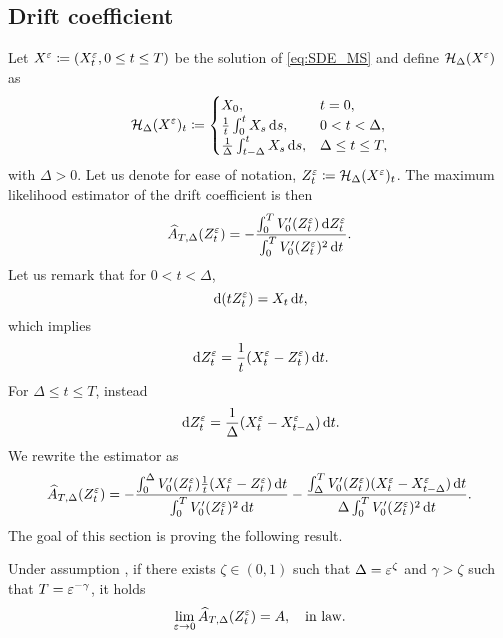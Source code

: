 \documentclass[10pt]{article}
\begin{document}
\subsection{Drift coefficient}\label{sec:ACont}
Let $X^\varepsilon \coloneqq (X^\varepsilon_t, 0\leq t \leq T)$ be the solution of \eqref{eq:SDE_MS} and define $\mathcal H_\Delta(X^\varepsilon)$ as
\begin{equation}\label{eq:ContMovingAverage}
	\mathcal H_\Delta(X^\varepsilon)_t \coloneqq 
	\begin{cases} 
	X_0, &t = 0, \\
	\frac1t \int_0^t X_s \,\mathrm{d} s, &0 < t < \Delta, \\
	\frac1\Delta \int_{t-\Delta}^t X_s \,\mathrm{d} s, &\Delta \leq t \leq T,\\
	\end{cases}
\end{equation}
with $\Delta > 0$. Let us denote for ease of notation, $Z^\varepsilon_t \coloneqq \mathcal H_\Delta(X^\varepsilon)_t$. The maximum likelihood estimator of the drift coefficient is then
\begin{equation}
	\widehat A_{T, \Delta}(Z_t^\varepsilon) = - \frac{\int_0^T V_0'(Z^\varepsilon_t) \,\mathrm{d} Z^\varepsilon_t}{\int_0^T V_0'(Z^\varepsilon_t)^2 \,\mathrm{d} t}.
\end{equation}
Let us remark that for $0 < t < \Delta$, 
\begin{equation}
	\,\mathrm{d} (t Z^\varepsilon_t) = X_t \,\mathrm{d} t,
\end{equation}
which implies 
\begin{equation}\label{eq:MovAvDifferential}
	\,\mathrm{d} Z^\varepsilon_t = \frac1t (X^\varepsilon_t - Z^\varepsilon_t) \,\mathrm{d} t.
\end{equation}
For $\Delta \leq t \leq T$, instead
\begin{equation}
	\,\mathrm{d} Z^\varepsilon_t = \frac1\Delta (X^\varepsilon_t - X^\varepsilon_{t-\Delta}) \,\mathrm{d} t.
\end{equation}
We rewrite the estimator as
\begin{equation}
	\widehat A_{T, \Delta}(Z_t^\varepsilon) = -\frac{\int_0^\Delta V_0'(Z^\varepsilon_t) \frac1t (X^\varepsilon_t - Z^\varepsilon_t) \,\mathrm{d} t}{\int_0^T V_0'(Z^\varepsilon_t)^2 \,\mathrm{d} t} -\frac{\int_\Delta^T V_0'(Z^\varepsilon_t) (X^\varepsilon_t - X^\varepsilon_{t-\Delta}) \,\mathrm{d} t}{\Delta\int_0^T V_0'(Z^\varepsilon_t)^2 \,\mathrm{d} t}.
\end{equation}
The goal of this section is proving the following result.
\begin{theorem}\label{thm:DriftContinuous} Under assumption , if there exists $\zeta \in (0, 1)$ such that $\Delta = \varepsilon^{\zeta}$ and $\gamma > \zeta$ such that $T = \varepsilon^{-\gamma}$, it holds 
\begin{equation}
	\lim_{\varepsilon\to 0} \widehat A_{T, \Delta}(Z_t^\varepsilon) = A, \quad \text{in law}.
\end{equation}
\end{theorem}
\end{document}
